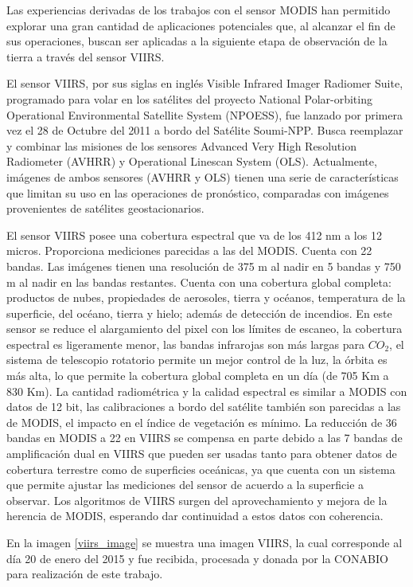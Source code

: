 Las experiencias derivadas de los trabajos con el sensor MODIS han permitido explorar una gran cantidad de aplicaciones potenciales que, al alcanzar el fin de sus operaciones, buscan ser aplicadas a la siguiente etapa de observación de la tierra a través del sensor VIIRS.

El sensor VIIRS, por sus siglas en inglés Visible Infrared Imager Radiomer Suite, programado para volar en los satélites del proyecto National Polar-orbiting  Operational Environmental Satellite System (NPOESS), fue lanzado por primera vez el 28 de Octubre del 2011 a bordo del Satélite Soumi-NPP. Busca reemplazar y combinar las misiones de los sensores Advanced Very High Resolution Radiometer (AVHRR) y Operational Linescan System (OLS). Actualmente, imágenes de ambos sensores (AVHRR y OLS) tienen una serie de características que limitan su uso  en las operaciones de pronóstico, comparadas con imágenes provenientes de satélites geostacionarios. 

El sensor VIIRS posee una cobertura espectral que va de los 412 nm a los 12 micros. Proporciona mediciones parecidas a las del MODIS. Cuenta con 22 bandas. Las imágenes tienen una resolución de 375 m al nadir en 5 bandas y 750 m al nadir en las bandas restantes. Cuenta con una cobertura global completa:  productos de nubes, propiedades de aerosoles, tierra y océanos, temperatura de la superficie, del océano, tierra y hielo; además de detección de incendios. En este sensor se reduce el alargamiento del pixel con los límites de escaneo, la cobertura espectral es ligeramente menor, las bandas infrarojas son más largas para $CO_{2}$, el sistema de telescopio rotatorio permite un mejor control de la luz, la órbita es más alta, lo que permite la cobertura global completa en un día (de 705 Km a 830 Km). La cantidad radiométrica y la calidad espectral es similar a MODIS con datos de 12 bit, las calibraciones a bordo del satélite también son parecidas a las de MODIS, el impacto en el índice de vegetación es mínimo. La reducción de 36 bandas en MODIS a 22 en VIIRS se compensa en parte debido a las 7 bandas de amplificación dual en VIIRS que pueden ser usadas tanto para obtener datos de cobertura terrestre  como de superficies oceánicas, ya que cuenta con un sistema que permite ajustar las mediciones del sensor de acuerdo a la superficie a observar. Los algoritmos de VIIRS surgen del aprovechamiento y mejora de la herencia de MODIS, esperando dar continuidad a estos datos con coherencia. 

En la imagen \ref{viirs_image} se muestra una imagen VIIRS, la cual corresponde al día 20 de enero del 2015 y fue recibida, procesada y donada por la CONABIO para realización de este trabajo. 

